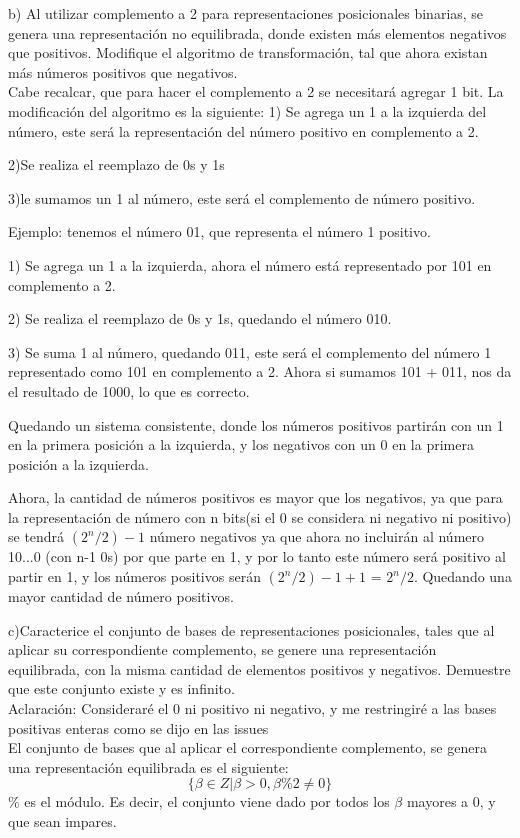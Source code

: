 \documentclass[letter]{article}
\begin{document}
\begin{pregunta}{2}
	$$\quad$$
	$$\quad$$
	
	b) Al utilizar complemento a 2 para representaciones posicionales binarias, se genera una representación no equilibrada, donde existen más elementos negativos que positivos. Modifique el algoritmo de transformación, tal que ahora existan más números positivos que negativos.
	$$\quad$$
	Cabe recalcar, que para hacer el complemento a 2 se necesitará agregar 1 bit.
	La modificación del algoritmo es la siguiente:
	    1) Se agrega un 1 a la izquierda del número, este será la representación del número positivo en complemento a 2.
	    
	    
	    2)Se realiza el reemplazo de 0s y 1s
	    
	    
	    3)le sumamos un 1 al número, este será el complemento de número positivo.
	    
	    
	    Ejemplo: tenemos el número 01, que representa el número 1 positivo. 
	    
	    
	    1) Se agrega un 1 a la izquierda, ahora el número está representado por 101 en complemento a 2.
	    
	    
	    2) Se realiza el reemplazo de 0s y 1s, quedando el número 010.
	    
	    
	    3) Se suma 1 al número, quedando 011, este será el complemento del número 1  representado como 101 en complemento a 2. Ahora si sumamos 101 + 011, nos da el resultado de 1000, lo que es correcto.
	    
	    
	    Quedando un sistema consistente, donde los números positivos partirán con un 1 en la primera posición a la izquierda, y los negativos con un 0 en la primera posición a la izquierda.
	    
	    Ahora, la cantidad de números positivos es mayor que los negativos, ya que para la representación de número con n bits(si el 0 se considera ni negativo ni positivo) se tendrá $(2^{n}/2) - 1$ número negativos ya que ahora no incluirán al número 10...0 (con n-1 0s) por que parte en 1, y por lo tanto este número  será positivo al partir en 1, y los números positivos serán $(2^{n}/2) - 1 + 1$ = $2^{n}/2$.
	Quedando una mayor cantidad de número positivos.
	    
	    

	
	
	
	
	
	
	
	
	$$\quad$$
	$$\quad$$
	c)Caracterice el conjunto de bases de representaciones posicionales, tales que al aplicar su correspondiente complemento, se genere una representación equilibrada, con la misma cantidad de elementos positivos y negativos. Demuestre que este conjunto existe y es infinito.
	$$\quad$$
	Aclaración: Consideraré el 0 ni positivo ni negativo, y me restringiré a las bases positivas enteras como se dijo en las issues
	$$\quad$$
	El conjunto de bases que al aplicar el correspondiente complemento, se genera una representación equilibrada es el siguiente:
	$$\{ \beta \in Z | \beta > 0 , \beta \% 2 \neq 0 \} $$
	$\%$ es el módulo. Es decir, el conjunto viene dado por todos los $\beta$ mayores a 0, y que sean impares.
	

\end{pregunta}
\end{document}
